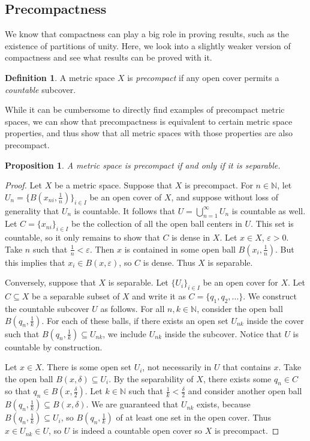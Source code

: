 \documentclass{article}
\theoremstyle{plain} %
\numberwithin{thm}{section} %
\newtheorem{prop}[thm]{Proposition}
\theoremstyle{definition}
\newtheorem{defn}[thm]{Definition}
\begin{document}
    \subsection{Precompactness}
    We know that compactness can play a big role in proving results, such as the existence of partitions of unity. Here, we look into a slightly weaker version of compactness and see what results can be proved with it.
    \begin{defn}
        A metric space \(X\) is \textit{precompact} if any open cover permits a \textit{countable} subcover.
    \end{defn}
    While it can be cumbersome to directly find examples of precompact metric spaces, we can show that precompactness is equivalent to certain metric space properties, and thus show that all metric spaces with those properties are also precompact.
    \begin{prop}
        A metric space is precompact if and only if it is separable.
    \end{prop}
    \begin{proof}
        Let \(X\) be a metric space. Suppose that \(X\) is precompact. For \(n \in \mathbb{N}\), let \(U_n = \{ B\left( x_{ni}, \frac{1}{n} \right) \}_{i \in I}\) be an open cover of \(X\), and suppose without loss of generality that \(U_n\) is countable. It follows that \(U = \bigcup_{n=1}^{\infty} U_n\) is countable as well. Let \(C = \{ x_{ni} \}_{i \in I}\) be the collection of all the open ball centers in \(U\). This set is countable, so it only remains to show that \(C\) is dense in \(X\). Let \(x \in X\), \(\varepsilon > 0\). Take \(n\) such that \(\frac{1}{n} < \varepsilon\). Then \(x\) is contained in some open ball \(B(x_i , \frac{1}{n})\). But this implies that \(x_i \in B(x, \varepsilon)\), so \(C\) is dense. Thus \(X\) is separable.

        Conversely, suppose that \(X\) is separable. Let \(\{ U_i \} _{i \in I}\) be an open cover for \(X\). Let \(C \subseteq X\) be a separable subset of \(X\) and write it as \(C = \{ q_1, q_2, ... \}\). We construct the countable subcover \(U\) as follows. For all \(n,k \in \mathbb{N}\), consider the open ball \(B(q_n, \frac{1}{k})\). For each of these balls, if there exists an open set \(U_{nk}\) inside the cover such that \(B(q_n, \frac{1}{k}) \subseteq U_{nk}\), we include \(U_{nk}\) inside the subcover. Notice that \(U\) is countable by construction.

        Let \(x \in X\). There is some open set \(U_i\), not necessarily in \(U\) that contains \(x\). Take the open ball \(B(x, \delta) \subseteq U_i\). By the separability of \(X\), there exists some \(q_n \in C\) so that \(q_n \in B( x, \frac{\delta}{2} )\). Let \(k \in \mathbb{N}\) such that \(\frac{1}{k} < \frac{\delta}{2}\) and consider another open ball \(B(q_n, \frac{1}{k}) \subseteq B(x, \delta)\). We are guaranteed that \(U_{nk}\) exists, because \(B(q_n, \frac{1}{k}) \subseteq U_i\), so \(B(q_n, \frac{1}{k})\) of at least one set in the open cover. Thus \(x \in U_{nk} \in U\), so \(U\) is indeed a countable open cover so \(X\) is precompact.
    \end{proof}
\end{document}
